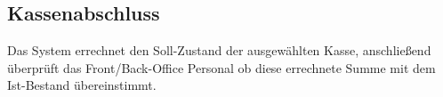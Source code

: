 \documentclass[../SubfileFeatures.tex]{subfiles}
\begin{document}
    \subsection{Kassenabschluss}
    Das System errechnet den Soll-Zustand der ausgewählten Kasse,
    anschließend überprüft das Front/Back-Office Personal ob diese errechnete Summe mit dem Ist-Bestand übereinstimmt.
\end{document}
